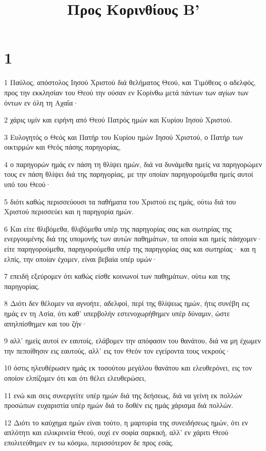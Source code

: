 

\title{Προς Κορινθίους Β'}


\chapter{1}

\par 1 Παύλος, απόστολος Ιησού Χριστού διά θελήματος Θεού, και Τιμόθεος ο αδελφός, προς την εκκλησίαν του Θεού την ούσαν εν Κορίνθω μετά πάντων των αγίων των όντων εν όλη τη Αχαΐα·
\par 2 χάρις υμίν και ειρήνη από Θεού Πατρός ημών και Κυρίου Ιησού Χριστού.
\par 3 Ευλογητός ο Θεός και Πατήρ του Κυρίου ημών Ιησού Χριστού, ο Πατήρ των οικτιρμών και Θεός πάσης παρηγορίας,
\par 4 ο παρηγορών ημάς εν πάση τη θλίψει ημών, διά να δυνάμεθα ημείς να παρηγορώμεν τους εν πάση θλίψει διά της παρηγορίας, με την οποίαν παρηγορούμεθα ημείς αυτοί υπό του Θεού·
\par 5 διότι καθώς περισσεύουσι τα παθήματα του Χριστού εις ημάς, ούτω διά του Χριστού περισσεύει και η παρηγορία ημών.
\par 6 Και είτε θλιβόμεθα, θλιβόμεθα υπέρ της παρηγορίας σας και σωτηρίας της ενεργουμένης διά της υπομονής των αυτών παθημάτων, τα οποία και ημείς πάσχομεν· είτε παρηγορούμεθα, παρηγορούμεθα υπέρ της παρηγορίας σας και σωτηρίας· και η ελπίς, την οποίαν έχομεν, είναι βεβαία υπέρ υμών·
\par 7 επειδή εξεύρομεν ότι καθώς είσθε κοινωνοί των παθημάτων, ούτω και της παρηγορίας.
\par 8 Διότι δεν θέλομεν να αγνοήτε, αδελφοί, περί της θλίψεως ημών, ήτις συνέβη εις ημάς εν τη Ασία, ότι καθ' υπερβολήν εστενοχωρήθημεν υπέρ δύναμιν, ώστε απηλπίσθημεν και του ζήν·
\par 9 αλλ' ημείς αυτοί εν εαυτοίς, ελάβομεν την απόφασιν του θανάτου, διά να μη έχωμεν την πεποίθησιν εις εαυτούς, αλλ' εις τον Θεόν τον εγείροντα τους νεκρούς·
\par 10 όστις ηλευθέρωσεν ημάς εκ τοσούτου μεγάλου θανάτου και ελευθερόνει, εις τον οποίον ελπίζομεν ότι και ότι θέλει ελευθερώσει,
\par 11 ενώ και σεις συνεργείτε υπέρ ημών διά της δεήσεως, διά να γείνη εκ πολλών προσώπων ευχαριστία υπέρ ημών διά το δοθέν εις ημάς χάρισμα διά πολλών.
\par 12 Διότι το καύχημα ημών είναι τούτο, η μαρτυρία της συνειδήσεως ημών, ότι εν απλότητι και ειλικρινεία Θεού, ουχί εν σοφία σαρκική, αλλ' εν χάριτι Θεού επολιτεύθημεν εν τω κόσμω, περισσότερον δε προς εσάς.
